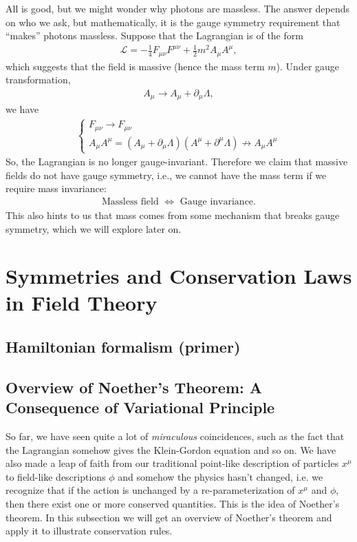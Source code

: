 \documentclass{book}
\numberwithin{equation}{section}
\theoremstyle{definition}
\newcommand{\p}{\partial}
\newcommand{\lag}{\mathcal{L}}
\begin{document}
All is good, but we might wonder why photons are massless. The answer depends on who we ask, but mathematically, it is the gauge symmetry requirement that ``makes'' photons massless. Suppose that the Lagrangian is of the form
\begin{align}
\lag = -\frac{1}{4}F_{\mu\nu}F^{\mu\nu}+ \frac{1}{2}m^2A_\mu A^\mu,
\end{align}
which suggests that the field is massive (hence the mass term $m$). Under gauge transformation,
\begin{align}
A_\mu \rightarrow A_\mu + \p_\mu \Lambda,
\end{align}
we have 
\begin{align}
\begin{cases}
F_{\mu\nu} \rightarrow F_{\mu\nu}\\
A_\mu A^\mu = (A_\mu + \p_\mu\Lambda)(A^\mu + \p^\mu\Lambda) \not\to A_\mu A^\mu
\end{cases}
\end{align}
So, the Lagrangian is no longer gauge-invariant. Therefore we claim that massive fields do not have gauge symmetry, i.e., we cannot have the mass term if we require mass invariance:
\begin{align}
\text{Massless field }\iff \text{ Gauge invariance}.
\end{align}
This also hints to us that mass comes from some mechanism that breaks gauge symmetry, which we will explore later on. 

\newpage

\chapter{Symmetries and Conservation Laws in Field Theory}

\section{Hamiltonian formalism (primer)}

\section{Overview of Noether's Theorem: A Consequence of Variational Principle}
So far, we have seen quite a lot of \textit{miraculous} coincidences, such as the fact that the Lagrangian somehow gives the Klein-Gordon equation and so on. We have also made a leap of faith from our traditional point-like description of particles $x^\mu$ to field-like descriptions $\phi$ and somehow the physics hasn't changed, i.e. we recognize that if the action is unchanged by a re-parameterization of $x^\mu$ and $\phi$, then there exist one or more conserved quantities. This is the idea of Noether's theorem. In this subsection we will get an overview of Noether's theorem and apply it to illustrate conservation rules.\\
\end{document}
